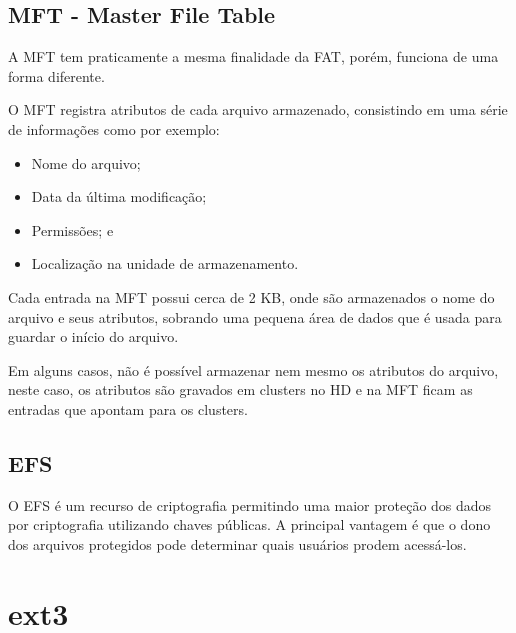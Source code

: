 \subsection{MFT - Master File Table}

A MFT tem praticamente a mesma finalidade da FAT, porém, funciona de uma forma diferente.

O MFT registra atributos de cada arquivo armazenado, consistindo em uma série de informações como por exemplo:

\begin{itemize}
	\item Nome do arquivo;
	\item Data da última modificação;
	\item Permissões; e
	\item Localização na unidade de armazenamento.
\end{itemize}

Cada entrada na MFT possui cerca de 2 KB, onde são armazenados o nome do arquivo e seus atributos, sobrando uma pequena área de dados que é usada para guardar o início do arquivo.

\begin{citacao}
  Em alguns casos, não é possível armazenar nem mesmo os atributos do arquivo, neste caso, os atributos são gravados em clusters no HD e na MFT ficam as entradas que apontam para os clusters.
\end{citacao}

\subsection{EFS}

O EFS é um recurso de criptografia permitindo uma maior proteção dos dados por criptografia utilizando chaves públicas. A principal vantagem é que o dono dos arquivos protegidos pode determinar quais usuários prodem acessá-los.

\section{ext3}

